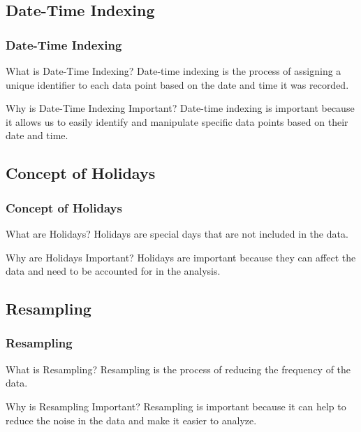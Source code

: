 \documentclass[aspectratio=169, hideothersubsections]{beamer}
\begin{document}
\subsection{Date-Time Indexing}

\begin{frame}
  \frametitle{Date-Time Indexing}
  \begin{block}{What is Date-Time Indexing?}
    Date-time indexing is the process of assigning a unique identifier to each data point based on the date and time it was recorded.
  \end{block}
  \begin{block}{Why is Date-Time Indexing Important?}
    Date-time indexing is important because it allows us to easily identify and manipulate specific data points based on their date and time.
  \end{block}
\end{frame}

\subsection{Concept of Holidays}

\begin{frame}
  \frametitle{Concept of Holidays}
  \begin{block}{What are Holidays?}
    Holidays are special days that are not included in the data.
  \end{block}
  \begin{block}{Why are Holidays Important?}
    Holidays are important because they can affect the data and need to be accounted for in the analysis.
  \end{block}
\end{frame}

\subsection{Resampling}

\begin{frame}
  \frametitle{Resampling}
  \begin{block}{What is Resampling?}
    Resampling is the process of reducing the frequency of the data.
  \end{block}
  \begin{block}{Why is Resampling Important?}
    Resampling is important because it can help to reduce the noise in the data and make it easier to analyze.
  \end{block}
\end{frame}
\end{document}
